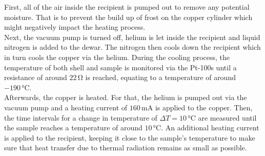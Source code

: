 First, all of the air inside the recipient is pumped out to remove any potential moisture. That is to prevent the build up of frost on the copper cylinder which might negatively impact the heating process. \\
Next, the vacuum pump is turned off, helium is let inside the recipient and liquid nitrogen is added to the dewar.
The nitrogen then cools down the recipient which in turn cools the copper via the helium.
During the cooling process, the temperature of both shell and sample is monitored via the Pt-100s until a resistance of around $22 \,\si{\ohm}$ is reached, equating to a temperature of around $-190 \,\si{\celsius}$. \\

Afterwards, the copper is heated. For that, the helium is pumped out via the vacuum pump and a heating current of $160 \,\si{\milli\ampere}$ is applied to the copper.
Then, the time intervals for a change in temperature of $\Delta T = 10 \,\si{\celsius}$ are measured until the sample reaches a temperature of around $10 \,\si{\celsius}$.
An additional heating current is applied to the recipient, keeping it close to the sample's temperature to make sure that heat transfer due to thermal radiation remains as small as possible.